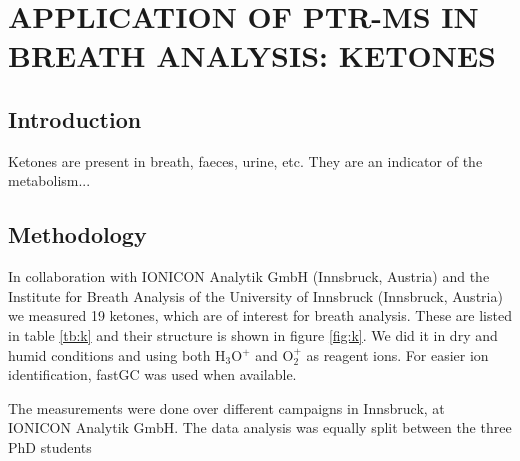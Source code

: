 \chapter{APPLICATION OF PTR-MS IN BREATH ANALYSIS: KETONES}


\section{Introduction}
Ketones are present in breath, faeces, urine, etc.
They are an indicator of the metabolism...


\section{Methodology}
In collaboration with IONICON Analytik GmbH (Innsbruck, Austria) and the Institute for Breath Analysis of the University of Innsbruck (Innsbruck, Austria) we measured 19 ketones, which are of interest for breath analysis. These are listed in table \ref{tb:k} and their structure is shown in figure \ref{fig:k}. We did it in dry and humid conditions and using both H$_3$O$^+$ and O$_2^+$ as reagent ions. For easier ion identification, fastGC was used when available.

The measurements were done over different campaigns in Innsbruck, at IONICON Analytik GmbH. The data analysis was equally split between the three PhD students


